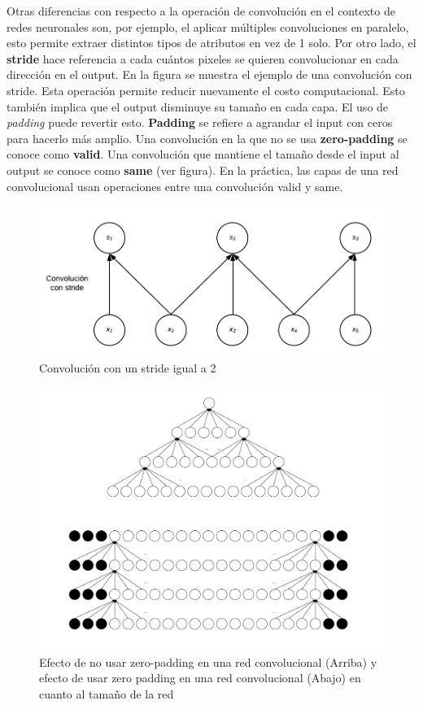 Otras diferencias con respecto a la operaci\'on de convoluci\'on en el contexto de redes neuronales son, por ejemplo, el aplicar m\'ultiples convoluciones en paralelo, esto permite extraer distintos tipos de atributos en vez de 1 solo. Por otro lado, el \textbf{stride} hace referencia a cada cu\'antos pixeles se quieren convolucionar en cada direcci\'on en el output. En la figura se muestra el ejemplo de una convoluci\'on con stride. Esta operaci\'on permite reducir nuevamente el costo computacional. Esto tambi\'en implica que el output disminuye su tama{\~{n}}o en cada capa. El uso de \textit{padding} puede revertir esto. \textbf{Padding} se refiere a agrandar el input con ceros para hacerlo m\'as amplio. Una convoluci\'on en la que no se usa \textbf{zero-padding} se conoce como \textbf{valid}. Una convoluci\'on que mantiene el tama{\~{n}}o desde el input al output se conoce como \textbf{same} (ver figura). En la pr\'actica, las capas de una red convolucional usan operaciones entre una convoluci\'on valid y same.

\begin{figure}[H]
\captionsetup{font=small,labelfont=small}
\caption{Convoluci\'on con un stride igual a 2}
\centering
\includegraphics[scale=.8]{img/cap7_stride.png}
\end{figure}

\begin{figure}[H]
\captionsetup{font=small,labelfont=small}
\caption{Efecto de no usar zero-padding en una red convolucional (Arriba) y efecto de usar zero padding en una red convolucional (Abajo) en cuanto al tama{\~{n}}o de la red}
\centering
\includegraphics[scale=.15]{img/cap7_padding.png}
\end{figure}

